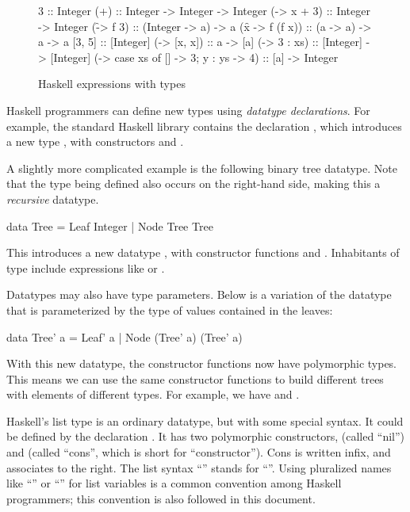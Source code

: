 \begin{figure}
\begin{hscode}
                                  3 :: Integer
                                (+) :: Integer -> Integer -> Integer
                      (\x -> x + 3) :: Integer -> Integer
                        (\f -> f 3) :: (Integer -> a) -> a
                  (\f x -> f (f x)) :: (a -> a) -> a -> a
                             [3, 5] :: [Integer]
                     (\x -> [x, x]) :: a -> [a]
                    (\xs -> 3 : xs) :: [Integer] -> [Integer]
(\xs -> case xs of [] -> 3; y : ys -> 4) :: [a] -> Integer
\end{hscode}
\caption{Haskell expressions with types}
\label{fig:haskell}
\end{figure}

Haskell programmers can define new types using \emph{datatype declarations}. For example, the standard Haskell library contains the declaration  , which introduces a new type , with constructors  and .

A slightly more complicated example is the following binary tree datatype. Note that the type being defined also occurs on the right-hand side, making this a \emph{recursive} datatype.
%
\begin{hscode}
data Tree = Leaf Integer | Node Tree Tree
\end{hscode}
%
This introduces a new datatype , with constructor functions   and . Inhabitants of type  include expressions like  or .

Datatypes may also have type parameters. Below is a variation of the  datatype that is parameterized by the type of values contained in the leaves:
%
\begin{hscode}
data Tree' a = Leaf' a | Node (Tree' a) (Tree' a)
\end{hscode}
%
With this new  datatype, the constructor functions now have polymorphic types. This means we can use the same constructor functions to build different trees with elements of different types. For example, we have  and .

Haskell's list type is an ordinary datatype, but with some special syntax. It could be defined by the declaration . It has two polymorphic constructors, \hs{[] :: [a]} (called ``nil'') and  (called ``cons'', which is short for ``constructor''). Cons is written infix, and associates to the right. The list syntax ``\hs{[x, y, z]}'' stands for ``''. Using pluralized names like ``'' or ``'' for list variables is a common convention among Haskell programmers; this convention is also followed in this document.

